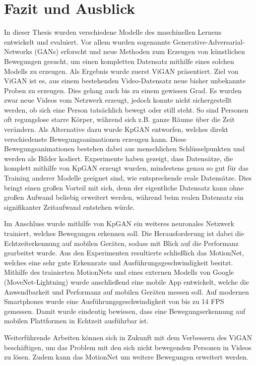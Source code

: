 \chapter{Fazit und Ausblick}
In dieser Thesis wurden verschiedene Modelle des maschinellen Lernens entwickelt
und evaluiert. Vor allem wurden sogenannte Generative-Adversarial-Networks
(GANs) erforscht und neue Methoden zum Erzeugen von künstlichen Bewegungen
gesucht, um einen kompletten Datensatz mithilfe eines solchen Modells zu
erzeugen. Als Ergebnis wurde zuerst ViGAN präsentiert. Ziel von ViGAN ist es,
aus einem bestehenden Video-Datensatz neue bisher unbekannte Proben zu erzeugen.
Dies gelang auch bis zu einem gewissen Grad. Es wurden zwar neue Videos vom
Netzwerk erzeugt, jedoch konnte nicht sichergestellt werden, ob sich eine Person
tatsächlich bewegt oder still steht.  So sind Personen oft regungslose starre
Körper, während sich z.B. ganze Räume über die Zeit verändern. Als Alternative
dazu wurde KpGAN entworfen, welches direkt verschiedenste Bewegungsanimationen
erzeugen kann. Diese Bewegungsanimationen bestehen dabei aus menschlichen
Schlüsselpunkten und werden als Bilder kodiert.  Experimente haben gezeigt, dass
Datensätze, die komplett mithilfe von KpGAN erzeugt wurden, mindestens genau so
gut für das Training anderer Modelle geeignet sind, wie entsprechende reale
Datensätze.  Dies bringt einen großen Vorteil mit sich, denn der eigentliche
Datensatz kann ohne großen Aufwand beliebig erweitert werden, während beim
realen Datensatz ein signifikanter Zeitaufwand entstehen würde.

Im Anschluss wurde mithilfe von KpGAN ein weiteres neuronales Netzwerk
trainiert, welches Bewegungen erkennen soll. Die Herausforderung ist dabei die
Echtzeiterkennung auf mobilen Geräten, sodass mit Blick auf die Performanz
gearbeitet wurde. Aus den Experimenten resultierte schließlich das MotionNet,
welches eine sehr gute Erkennrate und Ausführungsgeschwindigkeit besitzt.
Mithilfe des trainierten MotionNets und eines externen Modells von Google
(MoveNet-Lightning) wurde anschließend eine mobile App entwickelt, welche die
Anwendbarkeit und Performanz auf mobilen Geräten messen soll. Auf modernen
Smartphones wurde eine Ausführungsgeschwindigkeit von bis zu 14 FPS gemessen.
Damit wurde eindeutig bewiesen, dass eine Bewegungserkennung auf mobilen
Plattformen in Echtzeit ausführbar ist.

Weiterführende Arbeiten können sich in Zukunft mit dem Verbessern des ViGAN
be\-schäf\-tigen, um das Problem mit den sich nicht bewegenden Personen in
Videos zu lösen. Zudem kann das MotionNet um weitere Bewegungen erweitert
werden.